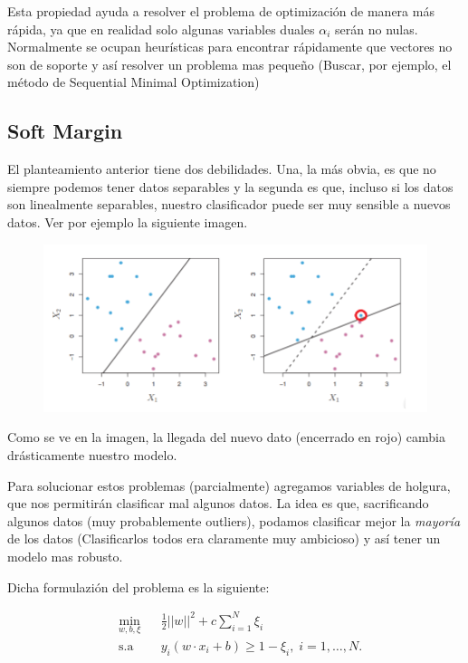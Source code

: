 Esta propiedad ayuda a resolver el problema de optimización de manera más rápida, ya que en realidad solo algunas variables duales $\alpha_i$ serán no nulas. Normalmente se ocupan heurísticas para encontrar rápidamente que vectores no son de soporte y así resolver un problema mas pequeño (Buscar, por ejemplo, el método de Sequential Minimal Optimization) 



\subsection{Soft Margin}


El planteamiento anterior tiene dos debilidades. Una, la más obvia, es que no siempre podemos tener datos separables y la segunda es que, incluso si los datos son linealmente separables, nuestro clasificador puede ser muy sensible a nuevos datos. Ver por ejemplo la siguiente imagen.

\begin{figure}[ht]
    \centering
    \includegraphics[scale=0.8]{img/sensibilidad.png}
    \label{fig:my_label3}
\end{figure}


Como se ve en la imagen, la llegada del nuevo dato (encerrado en rojo) cambia drásticamente nuestro modelo. 

Para solucionar estos problemas (parcialmente) agregamos variables de holgura, que nos permitirán clasificar mal algunos datos. La idea es que, sacrificando algunos datos (muy probablemente outliers), podamos clasificar mejor la \textit{mayoría} de los datos (Clasificarlos todos era claramente muy ambicioso) y así tener un modelo mas robusto.  


Dicha formulazión del problema es la siguiente:

\begin{equation*}
\begin{aligned}
& \underset{w,b, \xi}{\text{min}}
& & \frac{1}{2}||w||^2 + c\sum\limits_{i=1}^{N} \xi_i \\
& \text{s.a}
& & y_i (w\cdot x_i +b) \geq 1 - \xi_i, \; i = 1, \ldots, N.
\end{aligned}
\end{equation*}


